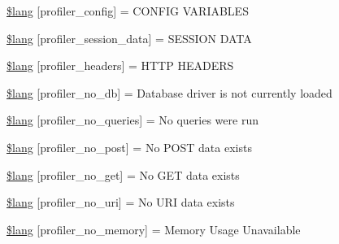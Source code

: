 \begin{DoxyCompactItemize}
\item 
\hyperlink{_admin_2system_2language_2english_2profiler__lang_8php_a68a43f2ac48abfc21cd12ee19e75e421}{\$lang} \mbox{[}\textquotesingle{}profiler\+\_\+config\textquotesingle{}\mbox{]} = \textquotesingle{}C\+O\+N\+F\+I\+G V\+A\+R\+I\+A\+B\+L\+E\+S\textquotesingle{}
\item 
\hyperlink{_admin_2system_2language_2english_2profiler__lang_8php_a6caa2b856b3211345f4a916febd79a84}{\$lang} \mbox{[}\textquotesingle{}profiler\+\_\+session\+\_\+data\textquotesingle{}\mbox{]} = \textquotesingle{}S\+E\+S\+S\+I\+O\+N D\+A\+T\+A\textquotesingle{}
\item 
\hyperlink{_admin_2system_2language_2english_2profiler__lang_8php_a079eb6971dec0c6115344e4b621e235f}{\$lang} \mbox{[}\textquotesingle{}profiler\+\_\+headers\textquotesingle{}\mbox{]} = \textquotesingle{}H\+T\+T\+P H\+E\+A\+D\+E\+R\+S\textquotesingle{}
\item 
\hyperlink{_admin_2system_2language_2english_2profiler__lang_8php_a74da0e429477e757130da70e135d4ae9}{\$lang} \mbox{[}\textquotesingle{}profiler\+\_\+no\+\_\+db\textquotesingle{}\mbox{]} = \textquotesingle{}Database driver is not currently loaded\textquotesingle{}
\item 
\hyperlink{_admin_2system_2language_2english_2profiler__lang_8php_a783abf2a3410bbc9c32e4b7bb774724b}{\$lang} \mbox{[}\textquotesingle{}profiler\+\_\+no\+\_\+queries\textquotesingle{}\mbox{]} = \textquotesingle{}No queries were run\textquotesingle{}
\item 
\hyperlink{_admin_2system_2language_2english_2profiler__lang_8php_a06e8171d08be812398060c126233a237}{\$lang} \mbox{[}\textquotesingle{}profiler\+\_\+no\+\_\+post\textquotesingle{}\mbox{]} = \textquotesingle{}No P\+O\+S\+T data exists\textquotesingle{}
\item 
\hyperlink{_admin_2system_2language_2english_2profiler__lang_8php_a8ecf037acbeb4a7b202b8238c8d1a328}{\$lang} \mbox{[}\textquotesingle{}profiler\+\_\+no\+\_\+get\textquotesingle{}\mbox{]} = \textquotesingle{}No G\+E\+T data exists\textquotesingle{}
\item 
\hyperlink{_admin_2system_2language_2english_2profiler__lang_8php_ac7d16f2f99b12aeaa609be6bcb89759e}{\$lang} \mbox{[}\textquotesingle{}profiler\+\_\+no\+\_\+uri\textquotesingle{}\mbox{]} = \textquotesingle{}No U\+R\+I data exists\textquotesingle{}
\item 
\hyperlink{_admin_2system_2language_2english_2profiler__lang_8php_a32345afdaa3f160ba1d21d03223313ad}{\$lang} \mbox{[}\textquotesingle{}profiler\+\_\+no\+\_\+memory\textquotesingle{}\mbox{]} = \textquotesingle{}Memory Usage Unavailable\textquotesingle{}

\end{DoxyCompactItemize}
